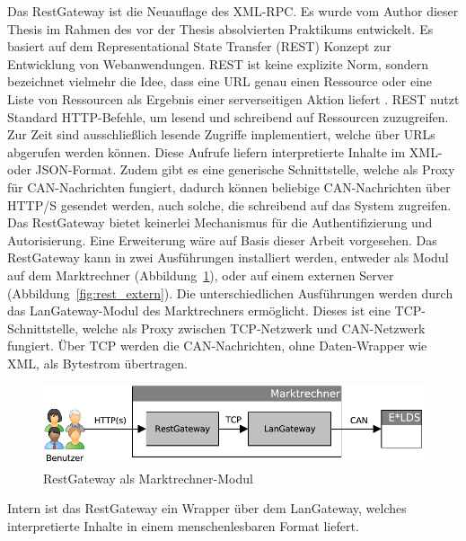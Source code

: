 \documentclass[11pt,a4paper]{report}
\begin{document}
Das RestGateway ist die Neuauflage des XML-RPC. Es wurde vom Author dieser Thesis im Rahmen des vor der Thesis absolvierten Praktikums entwickelt. Es basiert auf dem Representational State Transfer (REST) Konzept zur Entwicklung von Webanwendungen. REST ist keine explizite Norm, sondern bezeichnet vielmehr die Idee, dass eine URL genau einen Ressource oder eine Liste von Ressourcen als Ergebnis einer serverseitigen Aktion liefert \cite{wiki_rest}. REST nutzt Standard HTTP-Befehle, um lesend und schreibend auf Ressourcen zuzugreifen. Zur Zeit sind ausschließlich lesende Zugriffe implementiert, welche über URLs abgerufen werden können. Diese Aufrufe liefern interpretierte Inhalte im XML- oder JSON-Format. Zudem gibt es eine generische Schnittstelle, welche als Proxy für CAN-Nachrichten fungiert, dadurch können beliebige CAN-Nachrichten über HTTP/S gesendet werden, auch solche, die schreibend auf das System zugreifen. Das RestGateway bietet keinerlei Mechanismus für die Authentifizierung und Autorisierung. Eine Erweiterung wäre auf Basis dieser Arbeit vorgesehen. Das RestGateway kann in zwei Ausführungen installiert werden, entweder als Modul auf dem Marktrechner (Abbildung~\ref{fig:rest_intern}), oder auf einem externen Server (Abbildung~\ref{fig:rest_extern}). Die unterschiedlichen Ausführungen werden durch das LanGateway-Modul des Marktrechners ermöglicht. Dieses ist eine TCP-Schnittstelle, welche als Proxy zwischen TCP-Netzwerk und CAN-Netzwerk fungiert. Über TCP werden die CAN-Nachrichten, ohne Daten-Wrapper wie XML, als Bytestrom übertragen.

\begin{figure}[htbp]
\centering
\includegraphics[scale=0.7]{images/RestGateway_intern.pdf}
\caption[]{RestGateway als Marktrechner-Modul}
\label{fig:rest_intern}
\end{figure}

Intern ist das RestGateway ein Wrapper über dem LanGateway, welches interpretierte Inhalte in einem menschenlesbaren Format liefert.
\end{document}
